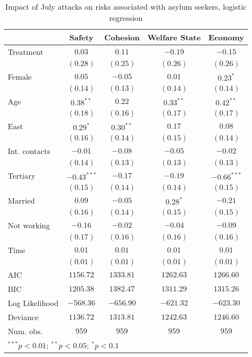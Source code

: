 
\begin{table}
\caption{Impact of July attacks on risks associated with asylum seekers, logistic regression}
\begin{center}
\begin{tabular}{l c c c c}
\toprule
 & Safety & Cohesion & Welfare State & Economy \\
\midrule
Treatment      & $0.03$        & $0.11$      & $-0.19$     & $-0.15$       \\
               & $(0.28)$      & $(0.25)$    & $(0.26)$    & $(0.26)$      \\
Female         & $0.05$        & $-0.05$     & $0.01$      & $0.23^{*}$    \\
               & $(0.14)$      & $(0.13)$    & $(0.14)$    & $(0.14)$      \\
Age            & $0.38^{**}$   & $0.22$      & $0.33^{**}$ & $0.42^{**}$   \\
               & $(0.18)$      & $(0.16)$    & $(0.17)$    & $(0.17)$      \\
East           & $0.29^{*}$    & $0.30^{**}$ & $0.17$      & $0.08$        \\
               & $(0.16)$      & $(0.14)$    & $(0.15)$    & $(0.14)$      \\
Int. contacts  & $-0.01$       & $-0.08$     & $-0.05$     & $-0.02$       \\
               & $(0.14)$      & $(0.13)$    & $(0.13)$    & $(0.13)$      \\
Tertiary       & $-0.43^{***}$ & $-0.17$     & $-0.19$     & $-0.66^{***}$ \\
               & $(0.15)$      & $(0.14)$    & $(0.14)$    & $(0.15)$      \\
Married        & $0.09$        & $-0.05$     & $0.28^{*}$  & $-0.21$       \\
               & $(0.16)$      & $(0.14)$    & $(0.15)$    & $(0.15)$      \\
Not working    & $-0.16$       & $-0.02$     & $-0.04$     & $-0.09$       \\
               & $(0.17)$      & $(0.16)$    & $(0.16)$    & $(0.16)$      \\
Time           & $0.01$        & $0.01$      & $0.01$      & $0.01$        \\
               & $(0.01)$      & $(0.01)$    & $(0.01)$    & $(0.01)$      \\
\midrule
AIC            & $1156.72$     & $1333.81$   & $1262.63$   & $1266.60$     \\
BIC            & $1205.38$     & $1382.47$   & $1311.29$   & $1315.26$     \\
Log Likelihood & $-568.36$     & $-656.90$   & $-621.32$   & $-623.30$     \\
Deviance       & $1136.72$     & $1313.81$   & $1242.63$   & $1246.60$     \\
Num. obs.      & $959$         & $959$       & $959$       & $959$         \\
\bottomrule
\multicolumn{5}{l}{\scriptsize{$^{***}p<0.01$; $^{**}p<0.05$; $^{*}p<0.1$}}
\end{tabular}
\label{tab_risk_glm}
\end{center}
\end{table}
